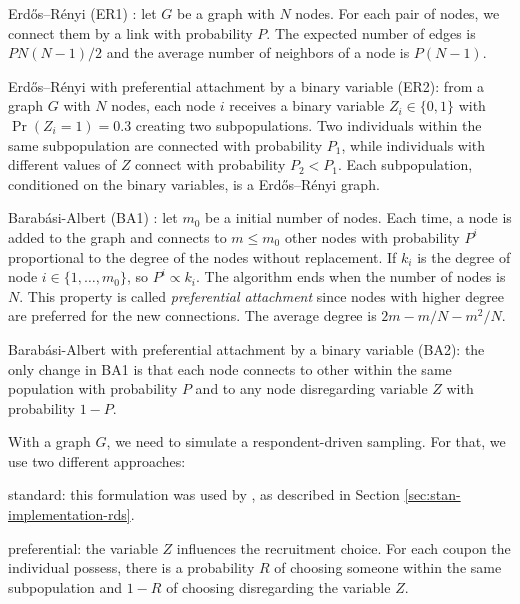 \begin{alineas}
  \item Erdős–Rényi (ER1) \cite{erdos1960evolution}: let $G$ be a graph with $N$
  nodes. For each pair of nodes, we connect them by a link with probability
  $P$. The expected number of edges is $PN(N-1)/2$ and the average number of
  neighbors of a node is $P(N-1)$.
  \item Erdős–Rényi with preferential attachment by a binary variable (ER2):
  from a graph $G$ with $N$ nodes, each
  node $i$ receives a binary variable $Z_i \in \{0,1\}$ with $\Pr(Z_i =
    1) = 0.3$ creating two subpopulations. Two individuals within the same
  subpopulation are connected with probability $P_1$, while individuals with
  different values of $Z$ connect with probability $P_2 < P_1$. Each
  subpopulation, conditioned on the binary variables, is a Erdős–Rényi
  graph.
  \item Barabási-Albert (BA1) \cite{barabasi1999emergence}: let $m_0$ be a
  initial number of nodes. Each time, a node is added to the graph and connects
  to $m \le m_0$ other nodes with probability $P^i$ proportional to the degree of
  the nodes without replacement. If $k_i$ is the degree of node $i \in \{1, \dots,
    m_0\}$, so $P^i \propto k_i$. The algorithm ends when the number of nodes
  is $N$. This property is called {\em preferential attachment} since nodes
  with higher degree are preferred for the new connections. The average degree
  is $2m - m/N - m^2/N$.
  \item Barabási-Albert with preferential attachment by a binary variable
  (BA2): the only change in BA1 is that each node connects to other within the
  same population with probability $P$ and to any node disregarding variable
  $Z$ with probability $1- P$.
\end{alineas}

With a graph $G$, we need to simulate a respondent-driven sampling. For that,
we use two different approaches:
\begin{alineas}
  \item standard: this formulation was used by \textcite[p.
    14670]{baraff2016estimating}, as described in Section
  \ref{sec:stan-implementation-rds}.
  \item preferential: the variable $Z$ influences the recruitment choice. For
  each coupon the individual possess, there is a probability $R$ of choosing
  someone within the same subpopulation and $1-R$ of choosing disregarding the
  variable $Z$.
\end{alineas}

